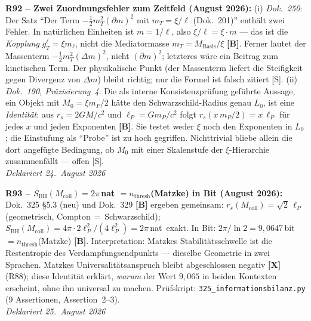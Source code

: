 \medskip
\textbf{R92 -- Zwei Zuordnungsfehler zum Zeitfeld (August 2026):}
(i) \emph{Dok.~250}: Der Satz \enquote{Der Term $-\tfrac12 m_T^2(\partial m)^2$ mit $m_T = \xi/\ell$ (Dok.~201)} enth\"alt zwei Fehler.
In nat\"urlichen Einheiten ist $m = 1/\ell$, also $\xi/\ell = \xi\cdot m$ --- das ist die \emph{Kopplung} $g_T^\ell = \xi m_\ell$, nicht die Mediatormasse $m_T = M_\mathrm{Basis}/\xi$ \textbf{[B]}.
Ferner lautet der Massenterm $-\tfrac12 m_T^2(\Delta m)^2$, nicht $(\partial m)^2$; letzteres w\"are ein Beitrag zum kinetischen Term.
Der physikalische Punkt (der Massenterm liefert die Steifigkeit gegen Divergenz von $\Delta m$) bleibt richtig; nur die Formel ist falsch zitiert [S].
(ii) \emph{Dok.~190, Pr\"azisierung~4}: Die als interne Konsistenzpr\"ufung gef\"uhrte Aussage, ein Objekt mit $M_0 = \xi m_P/2$ h\"atte den Schwarzschild-Radius genau $L_0$, ist eine \emph{Identit\"at}: aus $r_s = 2GM/c^2$ und $\ell_P = G m_P/c^2$ folgt $r_s(x\,m_P/2) = x\,\ell_P$ f\"ur jedes $x$ und jeden Exponenten \textbf{[B]}.
Sie testet weder $\xi$ noch den Exponenten in $L_0$; die Einstufung als \enquote{Probe} ist zu hoch gegriffen. Nichttrivial bliebe allein die dort angef\"ugte Bedingung, ob $M_0$ mit einer Skalenstufe der $\xi$-Hierarchie zusammenf\"allt --- offen [S].\\
\emph{Deklariert 24.~August 2026}

\medskip

\textbf{R93 -- $S_\mathrm{BH}(M_\mathrm{coll}) = 2\pi$\,nat $= n_\mathrm{thresh}$(Matzke) in Bit (August 2026):}
Dok.~325 §5.3 (neu) und Dok.~329 \textbf{[B]} ergeben gemeinsam:
$r_s(M_\mathrm{coll}) = \sqrt{2}\,\ell_P$ (geometrisch, Compton\,$=$\,Schwarzschild);
$S_\mathrm{BH}(M_\mathrm{coll}) = 4\pi\cdot 2\ell_P^2/(4\ell_P^2) = 2\pi$\,nat~exakt.
In Bit: $2\pi/\ln 2 = 9{,}0647$\,bit $= n_\mathrm{thresh}$(Matzke) \textbf{[B]}.
Interpretation: Matzkes Stabilitätsschwelle ist die Restentropie des
Verdampfungsendpunkts --- dieselbe Geometrie in zwei Sprachen.
Matzkes Universalitätsanspruch bleibt abgeschlossen negativ \textbf{[X]} (R88);
diese Identität erklärt, \emph{warum} der Wert $9{,}065$ in beiden Kontexten erscheint,
ohne ihn universal zu machen.
Prüfskript: \texttt{325\_informationsbilanz.py} (9 Assertionen, Assertion~2--3).\\
\emph{Deklariert 25.~August 2026}

\medskip


